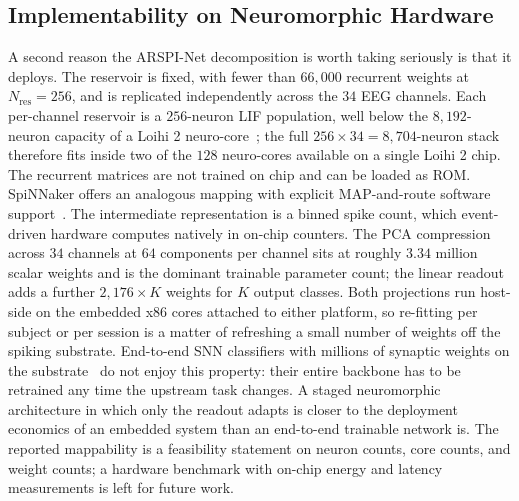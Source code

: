 \documentclass[journal]{IEEEtran}
\begin{document}
\subsection{Implementability on Neuromorphic Hardware}\label{sec:hw}
A second reason the ARSPI-Net decomposition is worth taking seriously is that it deploys. The reservoir is fixed, with fewer than $66{,}000$ recurrent weights at $N_{\text{res}}=256$, and is replicated independently across the $34$ EEG channels. Each per-channel reservoir is a $256$-neuron LIF population, well below the $8{,}192$-neuron capacity of a Loihi 2 neuro-core~\cite{davies2018loihi}; the full $256\times 34 = 8{,}704$-neuron stack therefore fits inside two of the $128$ neuro-cores available on a single Loihi 2 chip. The recurrent matrices are not trained on chip and can be loaded as ROM. SpiNNaker offers an analogous mapping with explicit MAP-and-route software support~\cite{furber2014spinnaker}. The intermediate representation is a binned spike count, which event-driven hardware computes natively in on-chip counters. The PCA compression across $34$ channels at $64$ components per channel sits at roughly $3.34$ million scalar weights and is the dominant trainable parameter count; the linear readout adds a further $2{,}176\times K$ weights for $K$ output classes. Both projections run host-side on the embedded x86 cores attached to either platform, so re-fitting per subject or per session is a matter of refreshing a small number of weights off the spiking substrate. End-to-end SNN classifiers with millions of synaptic weights on the substrate~\cite{gong2023sglnet} do not enjoy this property: their entire backbone has to be retrained any time the upstream task changes. A staged neuromorphic architecture in which only the readout adapts is closer to the deployment economics of an embedded system than an end-to-end trainable network is. The reported mappability is a feasibility statement on neuron counts, core counts, and weight counts; a hardware benchmark with on-chip energy and latency measurements is left for future work.
\end{document}
